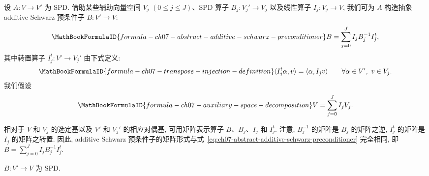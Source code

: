 设 $A:V\longrightarrow V'$ 为 SPD. 借助某些辅助向量空间 $V_j$ $(0\leq j\leq J)$、SPD 算子 $B_j:V_j'\longrightarrow V_j$ 以及线性算子 $I_j:V_j\longrightarrow V$, 我们可为 $A$ 构造抽象 additive Schwarz 预条件子 $B:V'\longrightarrow V$:
\begin{equation}
\MathBookFormulaID{formula-ch07-abstract-additive-schwarz-preconditioner}
\label{eq:ch07-abstract-additive-schwarz-preconditioner}
B=\sum_{j=0}^{J}I_jB_j^{-1}I_j^t,
\end{equation}
其中转置算子 $I_j^t:V'\longrightarrow V_j'$ 由下式定义:
\begin{equation}
\MathBookFormulaID{formula-ch07-transpose-injection-definition}
\label{eq:ch07-transpose-injection-definition}
\langle I_j^t\alpha,v\rangle=\langle\alpha,I_jv\rangle
\qquad\forall\alpha\in V',\ v\in V_j.
\end{equation}
我们假设
\begin{equation}
\MathBookFormulaID{formula-ch07-auxiliary-space-decomposition}
\label{eq:ch07-auxiliary-space-decomposition}
V=\sum_{j=0}^{J}I_jV_j.
\end{equation}

\begin{Remark}
\label{rem:ch07-matrix-form-additive-schwarz}
相对于 $V$ 和 $V_j$ 的选定基以及 $V'$ 和 $V_j'$ 的相应对偶基, 可用矩阵表示算子 $B$、$B_j$、$I_j$ 和 $I_j^t$. 注意, $B_j^{-1}$ 的矩阵是 $B_j$ 的矩阵之逆, $I_j^t$ 的矩阵是 $I_j$ 的矩阵之转置. 因此, additive Schwarz 预条件子的矩阵形式与式~\eqref{eq:ch07-abstract-additive-schwarz-preconditioner} 完全相同, 即 $B=\sum_{j=0}^{J}I_jB_j^{-1}I_j^t$.
\end{Remark}

\begin{Lemma}
\label{lem:ch07-additive-schwarz-spd}
$B:V'\longrightarrow V$ 为 SPD.
\end{Lemma}

